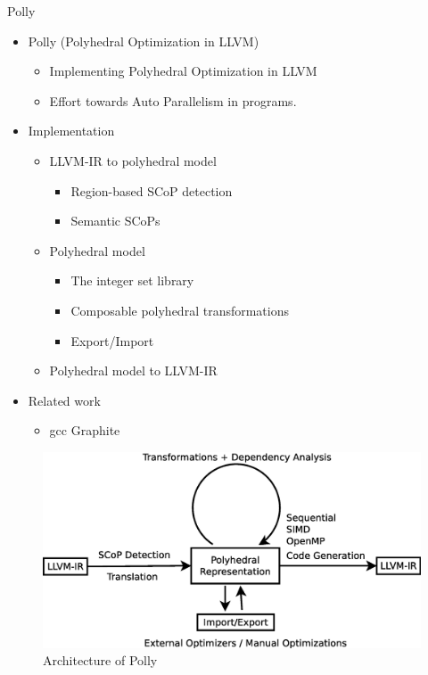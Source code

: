 \documentclass{beamer}
\begin{document}
\begin{frame}[allowframebreaks]{Polly}
\begin{itemize}
\item Polly (Polyhedral Optimization in LLVM)
	\begin{itemize}
	\item Implementing Polyhedral Optimization in LLVM
	\item Effort towards Auto Parallelism in programs.
	\end{itemize}
\item Implementation
	\begin{itemize}
	\item LLVM-IR to polyhedral model
			\begin{itemize}
			\item Region-based SCoP detection
			\item Semantic SCoPs
			\end{itemize}
	\item Polyhedral model
		\begin{itemize}
		\item The integer set library
		\item Composable polyhedral transformations
		\item Export/Import
		\end{itemize}
	\item Polyhedral model to LLVM-IR
	\end{itemize}
\item Related work
	\begin{itemize}
	\item gcc Graphite
	\end{itemize}
\end{itemize}

\begin{figure}
  \includegraphics[width=1\textwidth]{images/architecture.eps}
  \caption{Architecture of Polly}
  \label{fig:arch}
\end{figure}
\end{frame}
\end{document}
